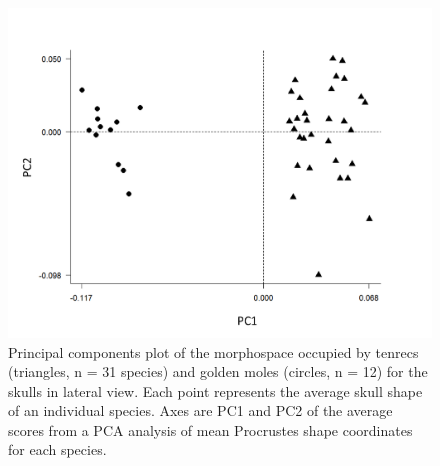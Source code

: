 \documentclass[12pt,a4paper]{article}
\begin{document}
	\begin{table}[h]			
	\caption[Comparison of morphological diversity in tenrecs and golden moles.]
	 
	\label{tab:diversity}  
	\end{table}

		
	\begin{figure}[H]
	\centering
	\includegraphics[width=1\linewidth]{figures/sklat_PCA_allspecies_BW.png}
	\caption[Morphospace (principal components) plot of morphological diversity in lateral views of tenrec and golden mole skulls.]
		{Principal components plot of the morphospace occupied by tenrecs (triangles, n = 31 species) and golden moles (circles, n = 12) for the skulls in lateral view. Each point represents the average skull shape of an individual species. Axes are PC1 and PC2 of the average scores from a PCA analysis of mean Procrustes shape coordinates for each species.}
	\label{fig:sklatPCA}
	\end{figure}
\end{document}
